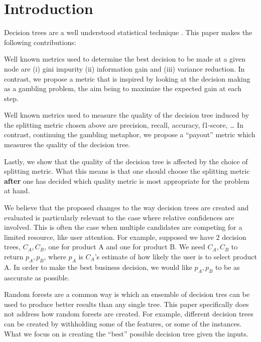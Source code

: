 \newcommand{\extra}{0}

\section{Introduction}

Decision trees are a well understood statistical technique \cite{Hastie2009}.
This paper makes the following contributions:
\be
\item Well known metrics used to determine the best decision to be made 
at a given node are (i) gini impurity (ii) information gain and (iii) 
variance reduction. In contrast, we propose a metric that is inspired by looking
at the decision making as a gambling problem, the aim being to maximize the
expected gain at each step.
\item 
Well known metrics used to measure the quality of the decision tree 
induced by the splitting metric chosen above are 
precision, recall, accuracy, f1-score, \ldots
In contrast, continuing the gambling metaphor, we propose a ``payout'' metric which
measures the quality of the decision tree. 
\item Lastly, we show that the quality of the decision tree is affected by the
choice of splitting metric. What this means is that one should choose the
splitting metric {\bf after} one has decided which quality metric is most
appropriate for the problem at hand.
\ee

We believe that the proposed changes to the way decision trees are created and
evaluated is particularly relevant to the case where relative
confidences are involved. This is often the case when multiple candidates are
competing for a limited resource, like user attention. 
For example, supposed we have 2 decision trees, \(C_A, C_B\), one for product A and one for
product B.  We need \(C_A, C_B\) to return \(p_A, p_B\), where \(p_A\) is
\(C_A\)'s estimate of how likely the user is to select product A. In order to
make the best business decision, we would like \(p_A, p_B\) to be as asccurate
as possible.

Random forests are a common way is which an ensemble of decision tres can be
used to produce better results than any single tree. This paper specifically
does not address how random forests are created. For example, different decision
trees can be created by withholding some of the features, or some of the
instances. What we focus on is creating the ``best'' possible decision tree
given the inputs.

